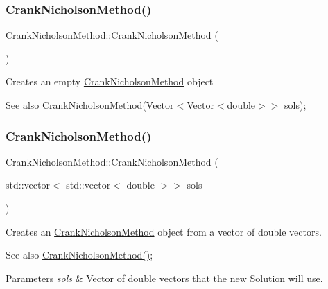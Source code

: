 \subsubsection{\texorpdfstring{Crank\+Nicholson\+Method()}{CrankNicholsonMethod()}\hspace{0.1cm}{\footnotesize\ttfamily [1/2]}}
{\footnotesize\ttfamily Crank\+Nicholson\+Method\+::\+Crank\+Nicholson\+Method (\begin{DoxyParamCaption}{ }\end{DoxyParamCaption})}

Creates an empty \hyperlink{class_crank_nicholson_method}{Crank\+Nicholson\+Method} object \begin{DoxySeeAlso}{See also}
\hyperlink{class_crank_nicholson_method}{Crank\+Nicholson\+Method(\+Vector$<$\+Vector$<$double$>$$>$ sols)}; 
\end{DoxySeeAlso}
\mbox{\label{class_crank_nicholson_method_a9738c40cac3d4f37775d6211544b178f}} 
\subsubsection{\texorpdfstring{Crank\+Nicholson\+Method()}{CrankNicholsonMethod()}\hspace{0.1cm}{\footnotesize\ttfamily [2/2]}}
{\footnotesize\ttfamily Crank\+Nicholson\+Method\+::\+Crank\+Nicholson\+Method (\begin{DoxyParamCaption}\item[{std\+::vector$<$ std\+::vector$<$ double $>$$>$}]{sols }\end{DoxyParamCaption})}

Creates an \hyperlink{class_crank_nicholson_method}{Crank\+Nicholson\+Method} object from a vector of double vectors. \begin{DoxySeeAlso}{See also}
\hyperlink{class_crank_nicholson_method_ae5052444cd3f042a554bb74d9ac556e0}{Crank\+Nicholson\+Method()}; 
\end{DoxySeeAlso}

\begin{DoxyParams}{Parameters}
{\em sols} & Vector of double vectors that the new \hyperlink{class_solution}{Solution} will use. \\
\hline
\end{DoxyParams}

